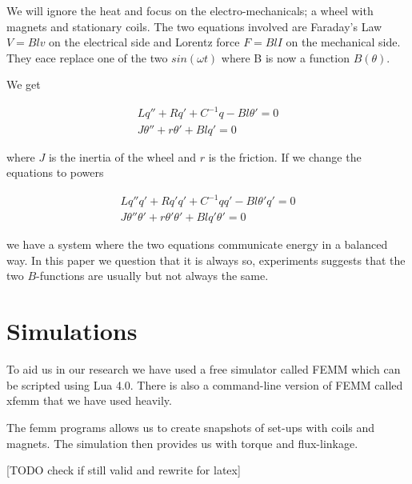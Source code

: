 \documentclass[]{elementary-physics}
\begin{document}
We will ignore the heat and focus on the electro-mechanicals; a wheel with magnets and stationary coils. The two equations involved are Faraday’s Law\cite{Faraday} $V = Blv$ on the electrical side and Lorentz force\cite{Lorentz} $F = BlI$ on the mechanical side. They eace replace one of the two $sin(\omega t)$ where B is now a function $B(\theta)$.

We get

\begin{subequations}
\begin{align}
Lq'' + Rq' + C^{-1}q - Bl\theta' = 0 \\
J\theta'' + r\theta' + Blq' = 0
\end{align}
\end{subequations}

where $J$ is the inertia of the wheel and $r$ is the friction. If we change the equations to powers

\begin{subequations}
\begin{align}
Lq''q' + Rq'q' + C^{-1}qq' - Bl\theta'q' = 0 \\
J\theta''\theta' + r\theta'\theta' + Blq'\theta' = 0
\end{align}
\end{subequations}

we have a system where the two equations communicate energy in a balanced way. In this paper we question that it is always so, experiments suggests that the two $B$-functions are usually but not always the same.

\section{Simulations}

To aid us in our research we have used a free simulator called FEMM\cite{FEMM} which can be scripted using Lua 4.0\cite{Lua}. There is also a command-line version of FEMM called xfemm\cite{xfemm} that we have used heavily.

The femm programs allows us to create snapshots of set-ups with coils and magnets. The simulation then provides us with torque and flux-linkage.

[TODO check if still valid and rewrite for latex]
\end{document}
